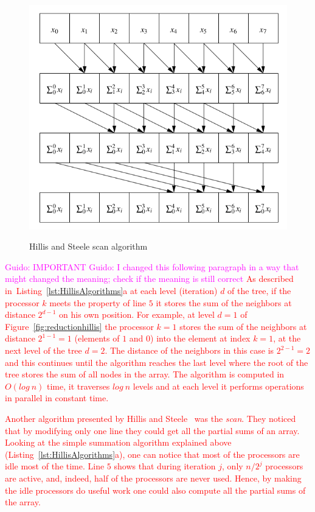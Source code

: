 \documentclass[Ingles]{ic-tese-v1}
\newcommand{\guido}[1]{\noindent\textcolor{magenta}{Guido: {#1}}}
\newcommand{\ed}[1]{\noindent\textcolor{red}{ {#1}}}
\newcommand{\guido}[1]{}
\newcommand{\ed}[1]{}
\newcommand{\rfig}[1]{Figure~\ref{fig:#1}}
\newcommand{\tit}[1]{{\textit{#1}}}
\newcommand{\rlsts}[2]{Listing~\ref{lst:#1}{#2}}
\begin{document}
\begin{figure}[h]
	\centering
	\caption{Hillis and  Steele scan algorithm}
	\includegraphics[scale=0.5]{images/hillisscan.png}
	\label{fig:scanhillis}
\end{figure}


\guido{IMPORTANT}
\guido{I changed this following paragraph in a way that might changed the meaning; check if the meaning is still correct}
\ed{As described in~\rlsts{HillisAlgorithms}{a} at each level
(iteration) $d$ of the tree, if the processor $k$  meets the property of line $5$ it
stores the sum of the neighbors at distance $2^{d-1}$ on his own position.
For  example, at  level $d  = 1$  of \rfig{reductionhillis} the processor $k = 1$ stores the sum of the neighbors at distance $2^{1-1} = 1$ (elements of $1$ and $0$) into the element at index $k = 1$, at the  next level of  the tree $d = 2$. The distance of the
neighbors in this case is  $2^{2-1} = 2$ and this continues until the algorithm reaches the last level where the root of the tree stores the sum of all nodes in the array. The algorithm is computed in $O(log\ n)$ time, it traverses $log\ n$ levels and at each level it performs operations in parallel in constant time.}


\ed{Another algorithm presented by Hillis and Steele~\cite{dataparallel} was the
\tit{scan}. They noticed that by modifying only one line they could get all the partial
sums of an array.  Looking at the simple summation algorithm explained
above (\rlsts{HillisAlgorithms}{a}), one can notice that most of the
processors are idle most of the time. Line $5$ shows that during iteration $j$,
only $n/2^{j}$ processors are active, and, indeed, half of the processors are
never used. Hence, by making the idle processors do useful work 
one could also compute all the partial sums of the array.} 
\end{document}
